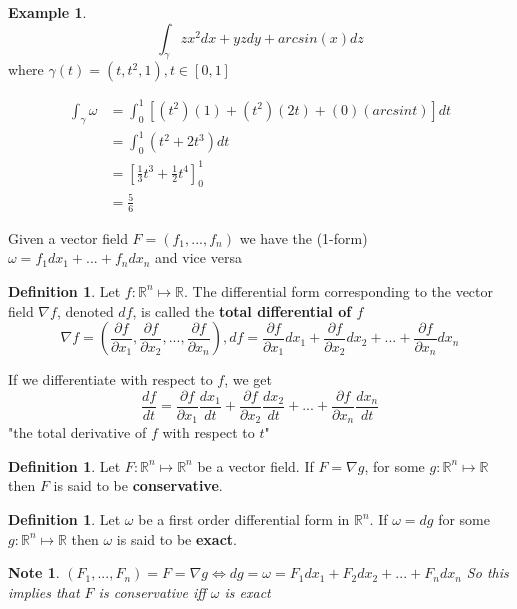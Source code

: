 \documentclass[12pt]{article}
\theoremstyle{plain}
\newtheorem*{note}{Note}
\theoremstyle{definition}
\newtheorem{definition}[theorem]{Definition}
\newtheorem{example}[theorem]{Example}
\begin{document}
\begin{example}
	$$\int_\gamma zx^2 dx + yzdy + arcsin(x)dz$$
	where $\gamma (t) = (t, t^2, 1), t\in [0,1]$

	\begin{align*}
		\int_\gamma \omega &= \int_0^1 [(t^2)(1) + (t^2)(2t) + (0)(arcsint) ]dt\\
		&= \int_0^1 (t^2+ 2t^3)dt\\
		&= [\frac{1}{3} t^3 + \frac{1}{2} t^4]_0^1\\
		&=\frac{5}{6}
	\end{align*}

\end{example}

Given a vector field $F=(f_1, ...,f_n)$ we have the (1-form) $\omega = f_1 dx_1 + ... + f_n dx_n$ and vice versa

\begin{definition}
	Let $f:\mathbb{R}^n \mapsto \mathbb{R}$. The differential form corresponding to the vector field $\nabla f$, denoted $df$, is called the \textbf{total differential of $f$}
	$$\nabla f = (\frac{\partial f}{\partial x_1}, \frac{\partial f}{\partial x_2}, ..., \frac{\partial f}{\partial x_n}), df = \frac{\partial f}{\partial x_1} d x_1 + \frac{\partial f}{\partial x_2} d x_2 + ... + \frac{\partial f}{\partial x_n} d x_n$$
\end{definition}

If we differentiate with respect to $f$, we get
$$\frac{df}{dt} = \frac{\partial f}{\partial x_1} \frac{d x_1}{dt} + \frac{\partial f}{\partial x_2} \frac{d x_2}{dt} + ... + \frac{\partial f}{\partial x_n} \frac{d x_n}{dt}$$
"the total derivative of $f$ with respect to $t$"

\begin{definition}
	Let $F:\mathbb{R}^n \mapsto \mathbb{R}^n$ be a vector field. If $F = \nabla g$, for some $g: \mathbb{R}^n \mapsto \mathbb{R}$ then $F$ is said to be \textbf{conservative}.
\end{definition}

\begin{definition}
	Let $\omega$ be a first order differential form in $\mathbb{R}^n$. If $\omega = dg$ for some $g: \mathbb{R}^n \mapsto \mathbb{R}$ then $\omega$ is said to be \textbf{exact}.
\end{definition}

\begin{note}
	$(F_1, ..., F_n) = F = \nabla g \Longleftrightarrow dg = \omega = F_1 dx_1 + F_2 dx_2 + ... + F_n dx_n$
	So this implies that $F$ is conservative iff $\omega$ is exact
\end{note}
\end{document}
